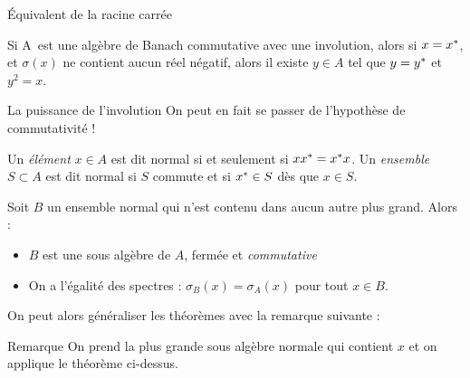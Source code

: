 \documentclass[11pt, xcolor=table]{beamer}
\begin{document}
\begin{frame}{Équivalent de la racine carrée}
    \begin{myth}
        Si A est une algèbre de Banach commutative avec une involution, alors si $x = x^\ast$, et $\sigma(x)$ ne contient aucun
        réel négatif, alors il existe $y \in A$ tel que $y = y^\ast$ et $y^2 = x$.
    \end{myth}

    \pause 

    \begin{alertblock}{La puissance de l'involution}
        On peut en fait se passer de l'hypothèse de commutativité !
    \end{alertblock}
\end{frame}



\begin{frame}
    \begin{mydef}
        Un \emph{élément} $x \in A$ est dit normal si et seulement si $xx^\ast = x^\ast x $. Un \emph{ensemble} $ S \subset A $ est dit
        normal si $S$ commute et si $x^\ast \in S$ dès que $x \in S$.  
    \end{mydef}

    \begin{myth}
        Soit $B$ un ensemble normal qui n'est contenu dans aucun autre plus grand. Alors :
        \begin{itemize}
            \item $B$ est une sous algèbre de $A$, fermée et \emph{commutative}
            \item On a l'égalité des spectres : $\sigma_{B}(x) = \sigma_{A}(x) $ pour tout $x \in B$.
        \end{itemize}
    \end{myth}

    On peut alors généraliser les théorèmes avec la remarque suivante :
    \begin{block}{Remarque}
        On prend la plus grande sous algèbre normale qui contient $x$ et on applique le théorème ci-dessus.
    \end{block}
\end{frame}
\end{document}
